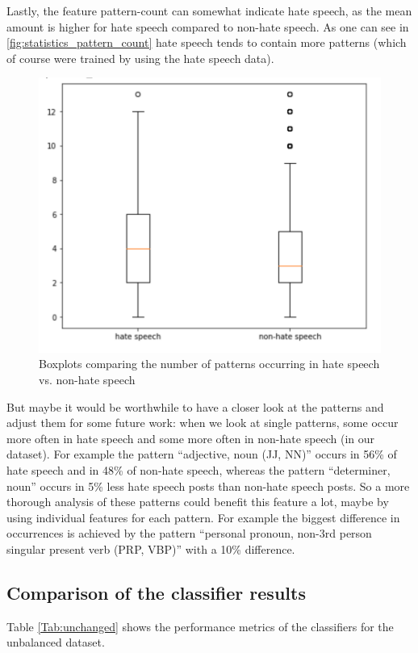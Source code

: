 Lastly, the feature pattern-count can somewhat indicate hate speech, as the mean amount is higher for hate speech compared to non-hate speech. As one can see in \autoref{fig:statistics_pattern_count} hate speech tends to contain more patterns (which of course were trained by using the hate speech data).

\begin{figure}[ht]
	\centering
	\includegraphics[width=0.7\linewidth]{figures/statistics_pattern_count.png}
	\caption{Boxplots comparing the number of patterns occurring in hate speech vs. non-hate speech}
	\label{fig:statistics_pattern_count}
\end{figure}

But maybe it would be worthwhile to have a closer look at the patterns and adjust them for some future work: when we look at single patterns, some occur more often in hate speech and some more often in non-hate speech (in our dataset). For example the pattern \enquote{adjective, noun (JJ, NN)} occurs in 56\% of hate speech and in 48\% of non-hate speech, whereas the pattern \enquote{determiner, noun} occurs in 5\% less hate speech posts than non-hate speech posts. So a more thorough analysis of these patterns could benefit this feature a lot, maybe by using individual features for each pattern. For example the biggest difference in occurrences is achieved by the pattern \enquote{personal pronoun, non-3rd person singular present verb (PRP, VBP)} with a 10\% difference.

\subsection{Comparison of the classifier results}
\label{ch:experimentDc}

Table \ref{Tab:unchanged} shows the performance metrics of the classifiers for the unbalanced dataset. 

